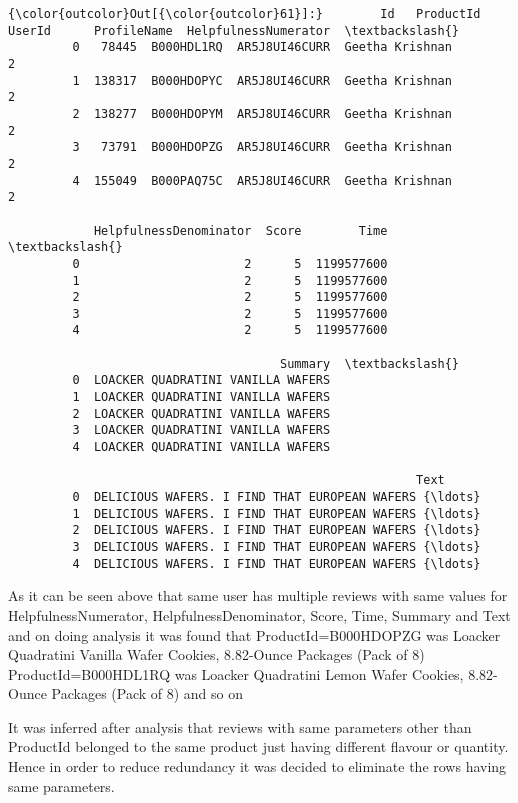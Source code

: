 \documentclass[11pt]{article}
\begin{document}
\begin{Verbatim}[commandchars=\\\{\}]
{\color{outcolor}Out[{\color{outcolor}61}]:}        Id   ProductId         UserId      ProfileName  HelpfulnessNumerator  \textbackslash{}
         0   78445  B000HDL1RQ  AR5J8UI46CURR  Geetha Krishnan                     2   
         1  138317  B000HDOPYC  AR5J8UI46CURR  Geetha Krishnan                     2   
         2  138277  B000HDOPYM  AR5J8UI46CURR  Geetha Krishnan                     2   
         3   73791  B000HDOPZG  AR5J8UI46CURR  Geetha Krishnan                     2   
         4  155049  B000PAQ75C  AR5J8UI46CURR  Geetha Krishnan                     2   
         
            HelpfulnessDenominator  Score        Time  \textbackslash{}
         0                       2      5  1199577600   
         1                       2      5  1199577600   
         2                       2      5  1199577600   
         3                       2      5  1199577600   
         4                       2      5  1199577600   
         
                                      Summary  \textbackslash{}
         0  LOACKER QUADRATINI VANILLA WAFERS   
         1  LOACKER QUADRATINI VANILLA WAFERS   
         2  LOACKER QUADRATINI VANILLA WAFERS   
         3  LOACKER QUADRATINI VANILLA WAFERS   
         4  LOACKER QUADRATINI VANILLA WAFERS   
         
                                                         Text  
         0  DELICIOUS WAFERS. I FIND THAT EUROPEAN WAFERS {\ldots}  
         1  DELICIOUS WAFERS. I FIND THAT EUROPEAN WAFERS {\ldots}  
         2  DELICIOUS WAFERS. I FIND THAT EUROPEAN WAFERS {\ldots}  
         3  DELICIOUS WAFERS. I FIND THAT EUROPEAN WAFERS {\ldots}  
         4  DELICIOUS WAFERS. I FIND THAT EUROPEAN WAFERS {\ldots}  
\end{Verbatim}
            
    As it can be seen above that same user has multiple reviews with same
values for HelpfulnessNumerator, HelpfulnessDenominator, Score, Time,
Summary and Text and on doing analysis it was found that
ProductId=B000HDOPZG was Loacker Quadratini Vanilla Wafer Cookies,
8.82-Ounce Packages (Pack of 8) ProductId=B000HDL1RQ was Loacker
Quadratini Lemon Wafer Cookies, 8.82-Ounce Packages (Pack of 8) and so
on

It was inferred after analysis that reviews with same parameters other
than ProductId belonged to the same product just having different
flavour or quantity. Hence in order to reduce redundancy it was decided
to eliminate the rows having same parameters.
\end{document}
